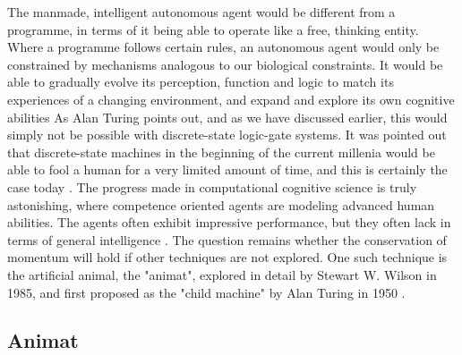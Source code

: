 The manmade, intelligent autonomous agent would be different from a programme, in terms of it being able to operate like a free, thinking entity.
Where a programme follows certain rules, an autonomous agent would only be constrained by mechanisms analogous to our biological constraints.
It would be able to gradually evolve its perception, function and logic to match its experiences of a changing environment, and expand and explore its own cognitive abilities \cite{franklin_graesser_agents}
As Alan Turing points out, and as we have discussed earlier, this would simply not be possible with discrete-state logic-gate systems.
It was pointed out that discrete-state machines in the beginning of the current millenia would be able to fool a human for a very limited amount of time,
and this is certainly the case today \cite{computing_machine_intelligence_turing}.
The progress made in computational cognitive science is truly astonishing, where competence oriented agents are modeling advanced human abilities.
The agents often exhibit impressive performance, but they often lack in terms of general intelligence \cite{wilson_animat}.
The question remains whether the conservation of momentum will hold if other techniques are not explored.
One such technique is the artificial animal, the "animat", explored in detail by Stewart W. Wilson in 1985, and first proposed as the "child machine" by Alan Turing in 1950 \cite{wilson_animat} \cite{turing_computing_machine_intelligence}.

\subsection{Animat}
